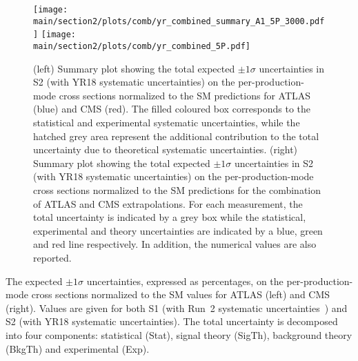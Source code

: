 \begin{figure}[hbtp]
\centering
\texttt{[image: \\main/section2/plots/comb/yr\_combined\_summary\_A1\_5P\_3000.pdf]}%
\texttt{[image: \\main/section2/plots/comb/yr\_combined\_5P.pdf]}%
\caption{(left) Summary plot showing the total expected $\pm 1\sigma$ uncertainties in S2 (with YR18 systematic uncertainties) on the  per-production-mode cross sections normalized to the SM predictions   for ATLAS (blue)  and CMS (red). The filled coloured box corresponds to the statistical and experimental systematic uncertainties, while the hatched grey area represent the additional contribution to the total uncertainty due to theoretical systematic uncertainties.
(right) Summary plot showing the total expected $\pm 1\sigma$  uncertainties in S2 (with YR18 systematic uncertainties) on the per-production-mode cross sections normalized to the SM predictions for the combination of ATLAS and CMS extrapolations. For each measurement,  the total uncertainty is indicated by a grey box while the statistical, experimental and theory uncertainties are indicated by a blue, green and red line respectively.  In addition, the numerical values are also reported.}
\label{fig:summary_A1_5P}
\end{figure}


\begin{table}[hbtp]
\centering
\caption{The expected $\pm 1\sigma$ uncertainties, expressed as percentages, on the per-production-mode cross sections normalized to the SM values  for  ATLAS (left) and CMS (right). Values are given for both S1 (with Run~2 systematic uncertainties~\cite{Sirunyan:2018koj}) and S2 (with YR18 systematic uncertainties). The total uncertainty is decomposed into four components: statistical (Stat), signal theory (SigTh), background theory (BkgTh) and experimental (Exp).}
\small
\hspace{0.5cm}

\label{tab:summary_A1_5P}
\vspace{0.5cm}
\end{table}




